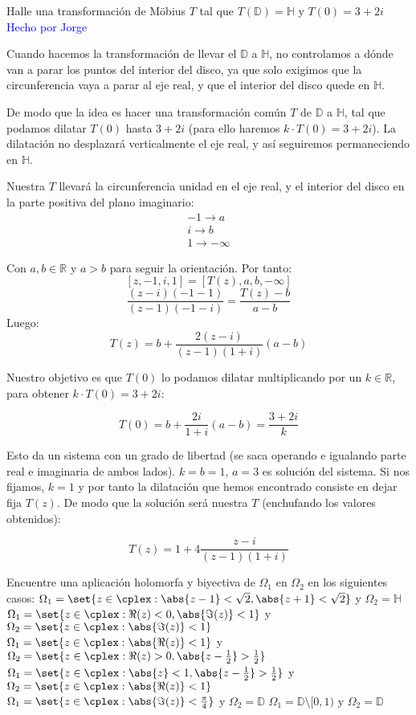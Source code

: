 \begin{problem}
Halle una transformación de Möbius $T$ tal que $T(\mathbb{D}) = \mathbb{H}$ y $T(0) = 3 + 2i$
\solution
\textcolor{blue}{Hecho por Jorge}

Cuando hacemos la transformación de llevar el $\mathbb{D}$ a $\mathbb{H}$, no controlamos a dónde van a parar los puntos del interior del disco, ya que solo exigimos que la circunferencia vaya a parar al eje real, y que el interior del disco quede en $\mathbb{H}$.

De modo que la idea es hacer una transformación común $T$ de $\mathbb{D}$ a $\mathbb{H}$, tal que podamos dilatar $T(0)$ hasta $3+2i$ (para ello haremos $k·T(0) = 3+2i$). La dilatación no desplazará verticalmente el eje real, y así seguiremos permaneciendo en $\mathbb{H}$.

Nuestra $T$ llevará la circunferencia unidad en el eje real, y el interior del disco en la parte positiva del plano imaginario:
\begin{align*}
	-1 \to a\\
	i \to b\\
	1 \to -∞
\end{align*}

Con $a,b ∈ ℝ$ y $a>b$ para seguir la orientación. Por tanto:
\[ [z,-1,i,1] = [T(z),a,b,-∞] \]
\[\frac{(z-i)(-1-1)}{(z-1)(-1-i)} = \frac{T(z) - b}{a-b}\]
Luego:
\[T(z) = b + \frac{2(z-i)}{(z-1)(1+i)}(a-b)\]

Nuestro objetivo es que $T(0)$ lo podamos dilatar multiplicando por un $k ∈ ℝ$, para obtener $k·T(0) = 3+2i$:

\[T(0) = b + \frac{2i}{1+i}(a-b) = \frac{3+2i}{k}\]

Esto da un sistema con un grado de libertad (se saca operando e igualando parte real e imaginaria de ambos lados). $k=b=1$, $a=3$ es solución del sistema. Si nos fijamos, $k=1$ y por tanto la dilatación que hemos encontrado consiste en dejar fija $T(z)$. De modo que la solución será nuestra $T$ (enchufando los valores obtenidos):

\[T(z) = 1 + 4 \frac{z-i}{(z-1)(1+i)}\]


\end{problem}

\begin{problem}
Encuentre una aplicación holomorfa y biyectiva de $\Omega_1$ en $\Omega_2$ en los siguientes casos:
\ppart $\Omega_{1} = \set{z \in \cplex: \abs{z-1} < \sqrt{2}, \abs{z+1} < \sqrt{2}}$ y $\Omega_{2} = \mathbb{H}$
\ppart $\Omega_{1} = \set{z \in \cplex: \Re(z) < 0, \abs{\Im(z)} < 1}$ y $\Omega_{2} = \set{z \in \cplex: \abs{\Im(z)} < 1}$
\ppart $\Omega_{1} = \set{z \in \cplex: \abs{\Re(z)} < 1}$ y $\Omega_{2} = \set{z \in \cplex: \Re(z) > 0, \abs{z - \frac{1}{2}} > \frac{1}{2}}$
\ppart $\Omega_{1} = \set{z \in \cplex: \abs{z} < 1, \abs{z - \frac{1}{2}} > \frac{1}{2}}$ y $\Omega_{2} = \set{z \in \cplex: \abs{\Re(z)} < 1}$
\ppart $\Omega_{1} = \set{z \in \cplex: \abs{\Im(z)} < \frac{\pi}{4}}$ y $\Omega_{2} = \mathbb{D}$
\ppart $\Omega_{1} = \mathbb{D}\setminus[0,1)$ y $\Omega_{2} = \mathbb{D}$
\solution

\end{problem}

